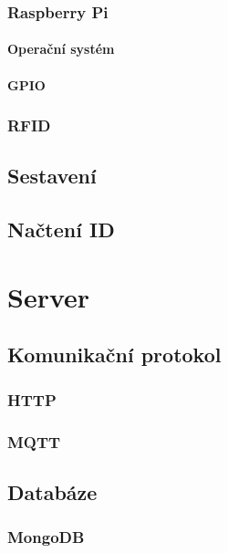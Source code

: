 \documentclass[czech,BP]{thesiskiv}
\begin{document}
		\subsection{Raspberry Pi}

			\subsubsection{Operační systém}

			\subsubsection{GPIO}

		\subsection{RFID}
	
	\section{Sestavení}

	\section{Načtení ID}



\chapter{Server}
		\section{Komunikační protokol}
			\subsection{HTTP}
		
			\subsection{MQTT}
	
		\section{Databáze}
			\subsection{MongoDB}
		
\end{document}
